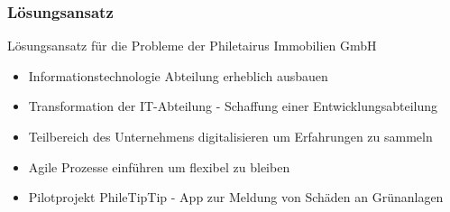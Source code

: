 \begin{frame}
  \frametitle{Lösungsansatz}

  \begin{block}{Lösungsansatz für die Probleme der Philetairus Immobilien GmbH}
 	\begin{itemize}
	\item Informationstechnologie Abteilung erheblich ausbauen
	 \item Transformation der IT-Abteilung - Schaffung einer Entwicklungsabteilung
	\item Teilbereich des Unternehmens digitalisieren um Erfahrungen zu sammeln
	\item Agile Prozesse einführen um flexibel zu bleiben
	\item  Pilotprojekt PhileTipTip - App zur Meldung von Schäden an Grünanlagen
	\end{itemize}
  \end{block}
\end{frame}
